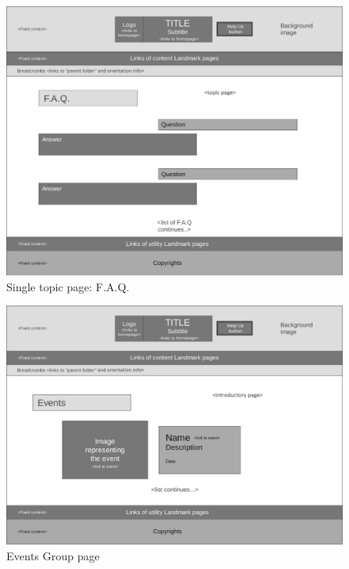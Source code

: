 %
\begin{figure}[h]
\includegraphics[width=1.3\textwidth, center]{MainMatter/images/7-Single-topic-FAQ}
\caption{Single topic page: F.A.Q.}
\label{fig:figure2}
\end{figure}
%
\begin{figure}[h]
\includegraphics[width=1.3\textwidth, center]{MainMatter/images/8-Group-event}
\caption{Events Group page}
\label{fig:figure2}
\end{figure}
%
